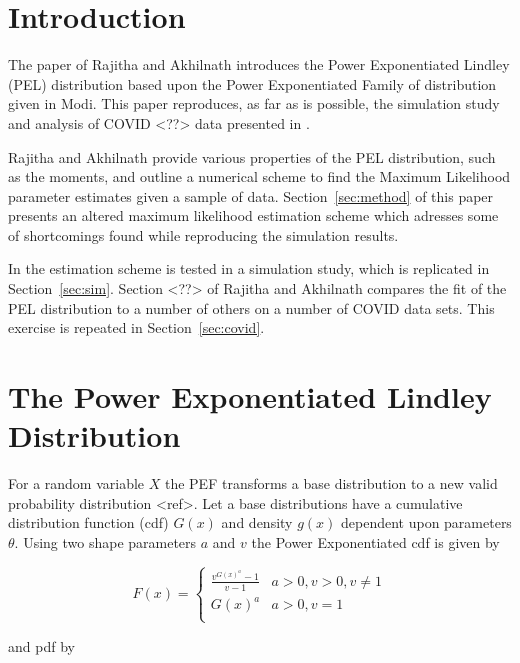 \section{Introduction}

The paper of Rajitha and Akhilnath\supercite{Rajitha2022} introduces the Power Exponentiated Lindley (PEL) distribution based upon the Power Exponentiated Family of distribution given in Modi\supercite{Modi}.
This paper reproduces, as far as is possible, the simulation study and analysis of COVID <??> data presented in \supercite{Rajitha2022}.

Rajitha and Akhilnath\supercite{Rajitha2022} provide various properties of the PEL distribution, such as the moments, and outline a numerical scheme to find the Maximum Likelihood parameter estimates given a sample of data. Section~\ref{sec:method} of this paper presents an altered maximum likelihood estimation scheme which adresses some of shortcomings found while reproducing the simulation results.

In \supercite{Rajitha2022} the estimation scheme is tested in a simulation study, which is replicated in Section~\ref{sec:sim}. Section <??> of Rajitha and Akhilnath\supercite{Rajitha2022} compares the fit of the PEL distribution to a number of others on a number of COVID data sets. This exercise is repeated in Section~\ref{sec:covid}.

\section{The Power Exponentiated Lindley Distribution}

For a random variable $X$ the PEF transforms a base distribution to a new valid probability distribution <ref>. Let a base distributions have a cumulative distribution function (cdf) $G\left(x\right)$ and density $g\left(x\right)$ dependent upon parameters $\theta$. Using two shape parameters $a$ and $v$ the Power Exponentiated cdf is given by

\begin{equation}
  F\left(x\right) = \left\{
    \begin{array}{cl}
      \frac{ v^{G\left(x\right)^{a}} - 1 }{v-1} & a>0,v>0,v\neq1\\
      G\left(x\right)^{a} & a>0,v=1\\
    \end{array}
    \right.
\end{equation}

and pdf by

